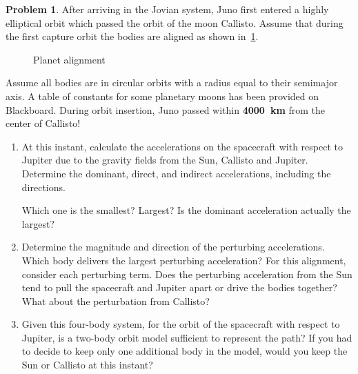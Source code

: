 \documentclass[10pt]{article}
\theoremstyle{definition}
\newtheorem{prob}{Problem}[section]
\newenvironment{subprob}%
{\renewcommand{\theenumi}{\alph{enumi}}\renewcommand{\labelenumi}{(\theenumi)}\begin{enumerate}}%
{\end{enumerate}}%
\begin{document}
\begin{prob}
    After arriving in the Jovian system, Juno first entered a highly elliptical orbit which passed the orbit of the moon Callisto.
    Assume that during the first capture orbit the bodies are aligned as shown in~\cref{fig:planets}.
    \begin{figure}[htbp]
        \centering
        \caption{Planet alignment~\label{fig:planets}}
    \end{figure}
    
    Assume all bodies are in circular orbits with a radius equal to their semimajor axis. 
    A table of constants for some planetary moons has been provided on Blackboard.
    During orbit insertion, Juno passed within \textbf{\SI{4000}{\kilo\meter}} from the center of Callisto!

    \begin{subprob}
        \item At this instant, calculate the accelerations on the spacecraft with respect to Jupiter due to the gravity fields from the Sun, Callisto and Jupiter.
            Determine the dominant, direct, and indirect accelerations, including the directions. 

            Which one is the smallest? Largest? Is the dominant acceleration actually the largest?

        \item Determine the magnitude and direction of the perturbing accelerations. 
            Which body delivers the largest perturbing acceleration?
            For this alignment, consider each perturbing term. 
            Does the perturbing acceleration from the Sun tend to pull the spacecraft and Jupiter apart or drive the bodies together?
            What about the perturbation from Callisto?

        \item Given this four-body system, for the orbit of the spacecraft with respect to Jupiter, is a two-body orbit model sufficient to represent the path?
            If you had to decide to keep only one additional body in the model, would you keep the Sun or Callisto at this instant?
    \end{subprob}
    

\end{prob}
\end{document}
